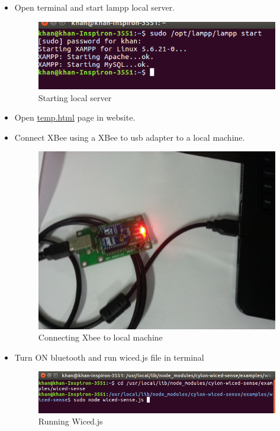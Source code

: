 \documentclass[11pt,a4paper]{article}
\begin{document}
	 \begin{itemize}
	 \item Open terminal and start lampp local server.
	 
	 	\begin{figure}[h]
    \centering
	\includegraphics[scale=0.5]{lampstart.png}
		 \caption{Starting local server}
	\end{figure}
	 
	 \item Open \href{https://github.com/eYSIP-2016/Wiced-Sense/blob/master/Codes/wiced_web/temp.html}{temp.html}  page in website.
	 \item Connect XBee using a XBee to usb adapter to a local machine.
	 
	 \begin{figure}[h]
        \centering
	    \includegraphics[scale=0.1]{20160722_194935.jpg}
	    	 \caption{Connecting Xbee to local machine}	 
	\end{figure}
	 
	 \item Turn ON bluetooth and run wiced.js file in terminal
	 
	 \begin{figure}[h]
    \centering
	\includegraphics[scale=0.5]{runwicedjs.png}
		 \caption{Running Wiced.js}
	\end{figure}
	 

\end{itemize}
\end{document}
